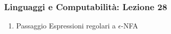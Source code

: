 




\begin{frame}[fragile]
	\frametitle{Linguaggi e Computabilità: Lezione 28}
\begin{enumerate}
\item
Passaggio Espressioni regolari a $\epsilon$-NFA
\end{enumerate}
\end{frame}



